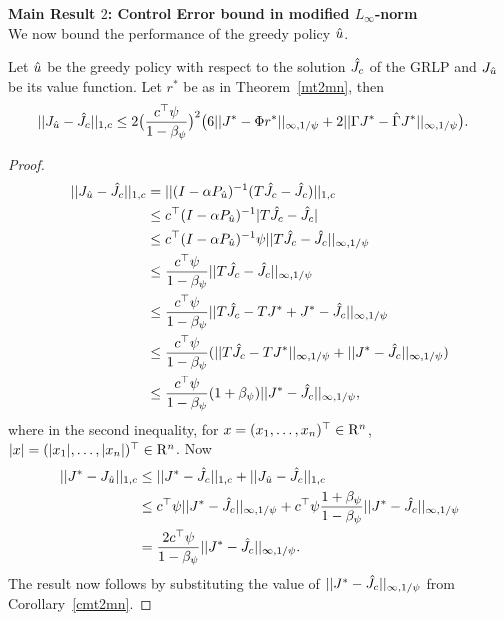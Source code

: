 \documentclass[12pt,draftcls,onecolumn]{IEEEtran}
\begin{document}
\textbf{Main Result $2$: Control Error bound in modified $L_\infty$-norm}\\
We now bound the performance of the greedy policy $\hat{u}$.
\begin{theorem}\label{polthe}
Let $\hat{u}$ be the greedy policy with respect to the solution $\hat{J}_c$ of the GRLP and $J_{\hat{u}}$ be its value function. Let $r^*$ be as in Theorem~\ref{mt2mn}, then
\begin{align}\label{polthebnd}
||J_{\hu}-\hj||_{1,c}&\leq 2\big(\frac{c^\top \psi}{1-\beta_{\psi}}\big)^2 \big(6 ||J^*-\Phi r^*||_{\mn}
+2||\Gamma J^*-\hg J^*||_{\mn}\big).
\end{align}
\end{theorem}
\begin{proof}
\begin{align}\label{polderv}
||J_{\hu}-\hj||_{1,c}&=||(I-\alpha P_{\hu})^{-1}(T\hj-\hj)||_{1,c}\nn\\
&\leq c^\top(I-\alpha P_{\hu})^{-1}|T\hj-\hj|\nn\\
&\leq c^\top (I-\alpha P_{\hu})^{-1} \psi ||T\hj-\hj||_{\mn}\nn\\
&\leq \frac{c^\top \psi}{1-\beta_{\psi}}||T\hj-\hj||_{\mn}\nn\\
&\leq \frac{c^\top \psi}{1-\beta_{\psi}}||T\hj-TJ^* +J^*- \hj||_{\mn}\nn\\
&\leq \frac{c^\top \psi}{1-\beta_{\psi}}(||T\hj-TJ^*||_{\mn} +||J^*- \hj||_{\mn})\nn\\
&\leq \frac{c^\top \psi}{1-\beta_{\psi}}(1+\beta_{\psi})||J^*- \hj||_{\mn},
\end{align}
where in the second inequality, for $x=(x_1,\ldots,x_n)^\top\in \mathrm{R}^n$, $|x|=(|x_1|,\ldots,|x_n|)^\top\in \mathrm{R}^n$. Now
\begin{align}
||J^*-J_{\hat{u}}||_{1,c}&\leq ||J^*-\hat{J}_c||_{1,c}+||J_{\hat{u}}-\hat{J}_c||_{1,c}\nonumber\\
&\leq c^\top \psi ||J^*-\hat{J}_c||_{\infty,1/\psi}+c^\top \psi\frac{1+\beta_\psi}{1-\beta_\psi}||J^*- \hat{J}_c||_{\infty,1/\psi}\nonumber\\
&=\frac{2c^\top \psi}{1-\beta_{\psi}}||J^*- \hat{J}_c||_{\infty,1/\psi}.
\end{align}
The result now follows by substituting the value of $||J^*- \hat{J}_c||_{\infty,1/\psi}$ from Corollary~\ref{cmt2mn}.
\end{proof}
\end{document}
